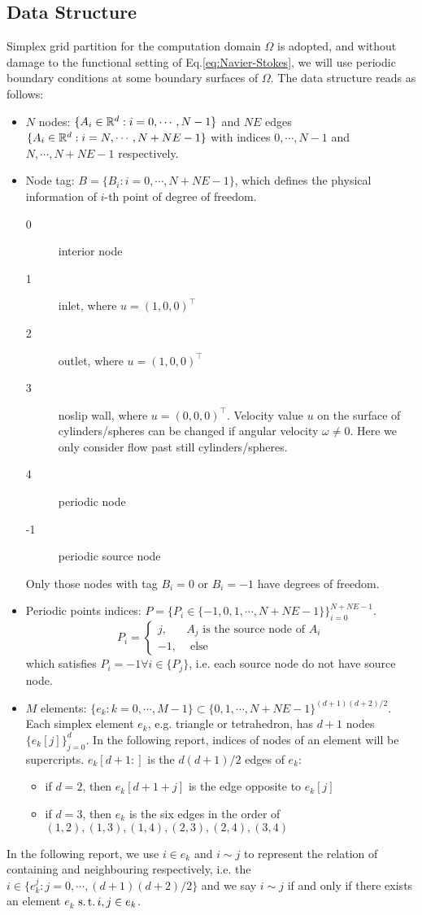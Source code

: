 \subsection{Data Structure}
Simplex grid partition for the computation domain $\Omega$ is adopted, 
and without damage to the functional setting of Eq.\eqref{eq:Navier-Stokes}, 
we will use periodic boundary conditions at some boundary surfaces of $\Omega$.
The data structure reads as follows:
\begin{itemize}
  \item $N$ nodes: $\{A_i\in\mathbb{R}^d:i=0,\cdots,N-1\}$ and 
    $NE$ edges $\{A_i\in\mathbb{R}^d:i=N,\cdots,N+NE-1\}$ 
    with indices $0,\cdots,N-1$ and $N,\cdots,N+NE-1$ respectively.

  \item Node tag: $B=\{B_i:i=0,\cdots,N+NE-1\}$, which defines the physical information of $i$-th point of degree of freedom.
    \begin{description}
      \item[0] interior node
      \item[1] inlet, where $u=(1,0,0)^\top$
      \item[2] outlet, where $u=(1,0,0)^\top$
      \item[3] noslip wall, where $u=(0,0,0)^\top$. 
        Velocity value $u$ on the surface of cylinders/spheres can be changed 
        if angular velocity $\omega\neq0$. Here we only consider flow past still cylinders/spheres.
      \item[4] periodic node
      \item[-1] periodic source node
    \end{description}
    Only those nodes with tag $B_i=0$ or $B_i=-1$ have degrees of freedom.

  \item Periodic points indices: $P=\{P_i\in\{-1,0,1,\cdots,N+NE-1\}\}_{i=0}^{N+NE-1}$.
    \[
      P_i=\left\{\begin{array}{ll}
        j, & A_j \text{ is the source node of } A_i \\
        -1, & \text{ else }
      \end{array}\right.
      \]
    which satisfies $P_i=-1\forall i\in \{P_j\}$, 
    i.e. each source node do not have source node.

  \item $M$ elements: $\{e_k:k=0,\cdots,M-1\}\subset\{0,1,\cdots,N+NE-1\}^{(d+1)(d+2)/2}$. 
    Each simplex element $e_k$, e.g. triangle or tetrahedron, has $d+1$ nodes $\{e_k[j]\}_{j=0}^{d}$. 
    In the following report, indices of nodes of an element will be supercripts.
    $e_k[d+1:]$ is the $d(d+1)/2$ edges of $e_k$:
    \begin{itemize}
      \item if $d=2$, then $e_k[d+1+j]$ is the edge opposite to $e_k[j]$
      \item if $d=3$, then $e_k$ is the six edges in the order of $(1,2),(1,3),(1,4),(2,3),(2,4),(3,4)$
    \end{itemize}

\end{itemize}
In the following report, we use $i\in e_k$ and $i\sim j$ to represent the 
relation of containing and neighbouring respectively, i.e.
the $i\in\{e_k^j:j=0,\cdots,(d+1)(d+2)/2\}$ and 
we say $i\sim j$ if and only if there exists an element $e_k$ $\operatorname*{s.t.} i,j\in e_k$.

